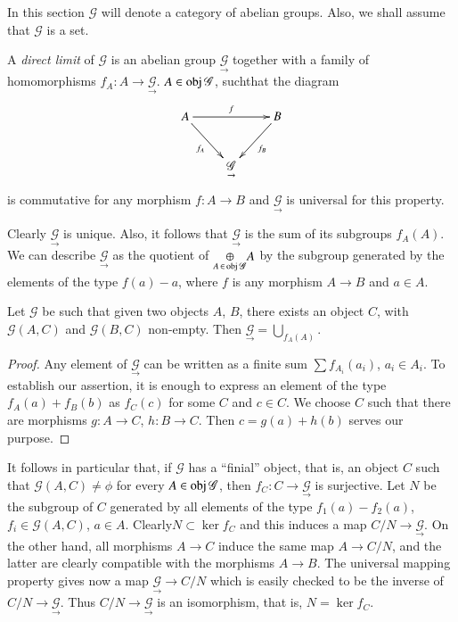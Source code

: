 In this section $\mathscr{G}$ will denote a category of abelian
groups. Also, we shall assume that $\mathscr{G}$ is a set. 

\begin{defi*}%
A {\em direct limit} of $\mathscr{G}$ is an abelian group $
\underset{\to}{\mathscr{G}}$ together with a family of homomorphisms $f_A
: A \to \underset{\to}{\mathscr{G}}$. $A \in \operatorname{obj} \mathscr{G}$,
such\pageoriginale that the diagram 
\[
\xymatrix{
A \ar[rr]^f \ar[dr]_{f_A} && B \ar[dl]^{f_B}\\
& \underset{\to}{\mathscr{G}} & 
}
\]
is commutative for any morphism $f: A \to B$ and
$\underset{\to}{\mathscr{G}}$ is universal for this property. 
\end{defi*}

Clearly $\underset{\to}{\mathscr{G}}$ is unique. Also, it follows that
$\underset \to {\mathscr{G}}$ is the sum of its subgroups $f_A(A)$. We
can describe $\underset \to {\mathscr{G}}$ as the  quotient of $
\underset {A \, \in \, \operatorname{obj} \mathscr{G}} \oplus A$ by the subgroup generated
by the elements of the type $f(a)-a$, where $f$ is any morphism $A \to
B$ and $a \in A$. 

\begin{lemma}\label{chap1:lem2.1}%
Let $\mathscr{G}$ be such that given two objects $A$, $B$, there
exists an object $C$, with $\mathscr{G}(A, C)$ and $\mathscr{G}(B, C)$
non-empty. Then $\underset \to {\mathscr{G}} = \bigcup _{f_A (A)}$. 
\end{lemma}

\begin{proof}
Any element of $\underset{\to}{\mathscr{G}}$ can be written as a
finite sum $\sum f_{A_i} (a_i)$, $a_i \in A_i$. To establish our
assertion, it is enough to express an element of the type $f_A (a) +
f_B(b)$ as $ f_C(c)$ for some $C$ and $c \in C$. We choose $C$ such
that there are morphisms $g:A \to C$, $h : B \to C$. Then $c = g(a) + h(b)$
serves our purpose. 
\end{proof}

It follows in particular that, if $\mathscr{G}$ has a ``finial''
object, that is, an object $C$ such that $\mathscr{G} (A, C) \neq
\phi$ for every $A \in \operatorname{obj} \mathscr{G}$, then $f_C : C \to \underset
\to {\mathscr{G}}$ is surjective. Let $N$ be the subgroup of $C$
generated by all elements of the type $f_1(a) - f_2(a)$, $f_i \in
\mathscr{G} (A, C)$, $a \in A$. Clearly\pageoriginale $N \subset \ker
f_C$ and this 
induces a map $C/N \to \underset \to {\mathscr{G}}$. On the other
hand, all morphisms $A \to C$ induce the same map $A \to C/N$, and the
latter are clearly compatible with the morphisms $A \to B$. The
universal mapping property gives now a map $\underset \to
{\mathscr{G}} \to C/N$ which is easily checked to be the inverse of
$C/N \to \underset \to {\mathscr{G}}$. Thus $C/N \to \underset \to
{\mathscr{G}}$ is an isomorphism, that is, $N = \ker f_C$. 

